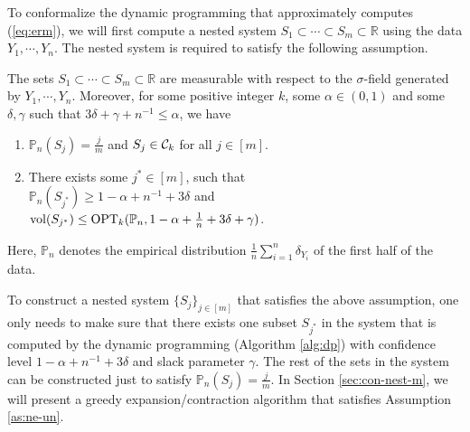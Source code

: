 To conformalize the dynamic programming that approximately computes (\ref{eq:erm}), we will first compute a nested system $S_1\subset\cdots\subset S_m\subset \mathbb{R}$ using the data $Y_1,\cdots,Y_n$. The nested system is required to satisfy the following assumption.

\begin{assumption}\label{as:ne-un}
The sets $S_1\subset\cdots\subset S_m\subset\mathbb{R}$ are measurable with respect to the $\sigma$-field generated by $Y_1,\cdots,Y_n$. Moreover, for some positive integer $k$, some $\alpha\in(0,1)$ and some $\delta,\gamma$ such that $3\delta+\gamma+n^{-1}\leq \alpha$, we have
\begin{enumerate}
\item $\mathbb{P}_n(S_j)=\frac{j}{m}$ and $S_j\in\mathcal{C}_k$ for all $j\in[m]$.
\item There exists some $j^*\in[m]$, such that\\ $\mathbb{P}_n(S_{j^*})\geq 1-\alpha+n^{-1}+3\delta$ and \\$\mathrm{vol}(S_{j^*})\leq \operatorname{OPT}_k(\mathbb{P}_n,1-\alpha+\frac{1}{n}+3\delta+\gamma)$.
\end{enumerate}
Here, $\mathbb{P}_n$ denotes the empirical distribution $\frac{1}{n}\sum_{i=1}^n\delta_{Y_i}$ of the first half of the data.
\end{assumption}
To construct a nested system $\{S_j\}_{j\in[m]}$ that satisfies the above assumption, one only needs to make sure that there exists one subset $S_{j^*}$ in the system that is computed by the dynamic programming (Algorithm \ref{alg:dp}) with confidence level $1-\alpha+n^{-1}+3\delta$ and slack parameter $\gamma$. The rest of the sets in the system can be constructed just to satisfy $\mathbb{P}_n(S_j)=\frac{j}{m}$. In Section \ref{sec:con-nest-m}, we will present a greedy expansion/contraction algorithm that satisfies Assumption \ref{as:ne-un}.

